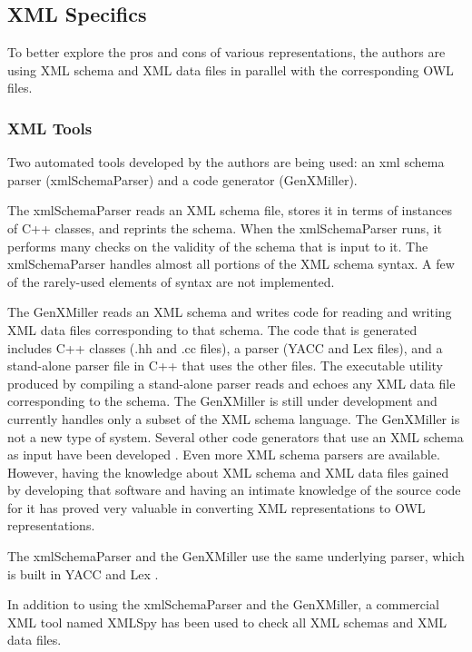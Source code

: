 \subsection{XML Specifics}
To better explore the pros and cons of various representations,
the authors are using XML schema and XML data files in parallel with the
corresponding OWL files.\\

\subsubsection{XML Tools}
Two automated tools developed by the authors are being used: an xml schema
parser (xmlSchemaParser) and a code generator (GenXMiller).  

The xmlSchemaParser reads an XML schema file, stores it in terms of
instances of C++ classes, and reprints the schema. When the xmlSchemaParser
runs, it performs many checks on the validity of the schema that is input
to it. The xmlSchemaParser handles almost all portions of the XML schema
syntax. A few of the rarely-used elements of syntax are not implemented.

The GenXMiller reads an XML schema and writes code for reading and writing
XML data files corresponding to that schema. The code that is generated
includes C++ classes (.hh and .cc files), a parser (YACC and Lex files), and
a stand-alone parser file in C++ that uses the other files.  The executable
utility produced by compiling a stand-alone parser reads and echoes any XML
data file corresponding to the schema. The GenXMiller is still under
development and currently handles only a subset of the XML schema language. 
The GenXMiller is not a
new type of system. Several other code generators that use an XML schema
as input have been developed \cite{XMLSchema1,ApacheXML}. 
Even more XML schema parsers are
available. However, having the knowledge about XML schema and XML data
files gained by developing that software and having an intimate knowledge
of the source code for it has proved very valuable in converting XML representations
to OWL representations.

The xmlSchemaParser and the GenXMiller use the same underlying parser,
which is built in YACC and Lex \cite{LexAndYACC}.

In addition to using the xmlSchemaParser and the GenXMiller, a commercial
XML tool named XMLSpy \cite{XMLSpyManual} has been used to check all XML
schemas and XML data files.\\

